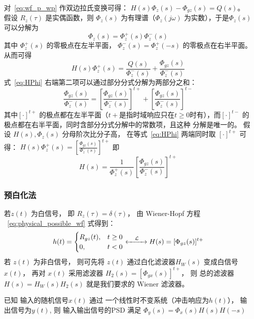 \documentclass{ctexart}
\numberwithin{equation}{section}
\begin{document}
对~\eqref{eq:wf_p_wp} 作双边拉氏变换可得：
$ H(s)\Phi_z(s) - \Phi_{gz}(s)= Q(s) $。 假设 $R_z(\tau)$ 是实偶函数，则 $\Phi_z(s)$ 为有理谱（$\Phi_z(j\omega)$ 为实数），于是$\Phi_z(s)$
可以分解为
\begin{equation} \label{eq:Phi_z_decom}    
\Phi_z(s) = \Phi_z^+(s)\Phi_z^{-}(s)
\end{equation} 
其中 $\Phi_z^+(s)$ 的零极点在左半平面， $\Phi_z^{-}(s) = \Phi_z^+(-s)$ 的零极点在右半平面。
从而可得 
\begin{equation}\label{eq:HPhi}
H(s) \Phi_z^+(s) = \frac{Q(s)}{\Phi_z^{-}(s)} + \frac{\Phi_{gz}(s)}{\Phi_z^{-}(s)}
\end{equation}
式~\eqref{eq:HPhi} 右端第二项可以通过部分分式分解为两部分之和：
$$
\frac{\Phi_{gz}(s)}{\Phi_z^{-}(s)} = \left[\frac{\Phi_{gz}(s)}{\Phi_z^{-}(s)}\right]^{t+} + \left[\frac{\Phi_{gz}(s)}{\Phi_z^{-}(s)}\right]^{t-}
$$
其中$[\cdot]^{t+}$ 的极点都在左半平面（$t+$是指时域响应只在$t\geq 0$时有），而$[\cdot]^{t-}$ 的极点都在右半平面，同时含部分分式分解中的常数项，且这种
分解是唯一的。
假设 $H(s),\Phi_z(s)$ 分母阶次比分子高， 在等式~\eqref{eq:HPhi} 两端同时取 $[\cdot]^{t+}$ 可得：
$ H(s)\Phi_z^+(s) = [\frac{\Phi_{gz}(s)}{\Phi_z^{-}(s)}]^{t+} $
即 
\begin{equation}\label{eq:wiener_transfer_p}
H(s) = \frac{1}{\Phi_z^+(s)}\left[\frac{\Phi_{gz}(s)}{\Phi_z^{-}(s)}\right]^{t+}
\end{equation}
\subsubsection{预白化法}
若$z(t)$ 为白信号， 即 $R_z(\tau) = \delta(\tau)$， 由 Wiener-Hopf 方程 ~\eqref{eq:physical_possible_wf} 式得到：
\begin{equation}\label{eq:white_method_a}
h(t) = \begin{cases} R_{gz}(t), & t\geq 0 \\
    0, & t<0 \\
\end{cases}
\xleftrightarrow{\quad\mathcal{L}\quad} H(s) = [\Phi_{gz}(s)]^{t+}
\end{equation}
若 $z(t)$ 为非白信号， 则可先将 $z(t)$ 通过白化滤波器$H_W(s)$ 变成白信号 $x(t)$， 再对 $x(t)$ 采用滤波器 $H_2(s) = [\Phi_{gx}(s)]^{t+}$， 则
总的滤波器 $ H(s) = H_W(s) H_2(s)$ 就是我们要求的 Wiener 滤波器。

已知 输入的随机信号$ x(t) $ 通过 一个线性时不变系统（冲击响应为$h(t)$）， 输出信号为$ y(t) $, 则 输入输出信号的PSD 满足 $ \Phi_y(s) = \Phi_x(s) H(s) H(-s) $
\end{document}
